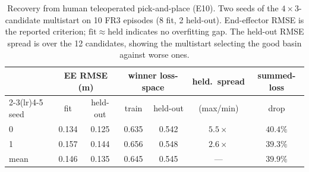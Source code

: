 \begin{table}[t]
  \centering
  \caption{Recovery from human teleoperated pick-and-place (E10). Two seeds of
  the $4{\times}3$-candidate multistart on 10 FR3 episodes (8 fit, 2 held-out).
  End-effector RMSE is the reported criterion; $\mathrm{fit}\approx\mathrm{held}$
  indicates no overfitting gap. The held-out RMSE spread is over the 12
  candidates, showing the multistart selecting the good basin against worse ones.}
  \label{tab:teleop}
  \begin{tabular}{lcccccc}
    \toprule
     & \multicolumn{2}{c}{EE RMSE (m)} & \multicolumn{2}{c}{winner loss-space}
       & held.\ spread & summed-loss \\
    \cmidrule(lr){2-3}\cmidrule(lr){4-5}
    seed & fit & held-out & train & held-out & (max/min) & drop \\
    \midrule
    0 & 0.134 & 0.125 & 0.635 & 0.542 & $5.5\times$ & $40.4\%$ \\
    1 & 0.157 & 0.144 & 0.656 & 0.548 & $2.6\times$ & $39.3\%$ \\
    \midrule
    mean & 0.146 & 0.135 & 0.645 & 0.545 & --- & $39.9\%$ \\
    \bottomrule
  \end{tabular}
\end{table}
